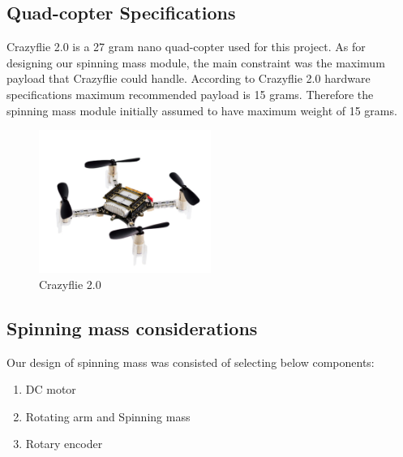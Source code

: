 \subsection{Quad-copter Specifications}
Crazyflie 2.0 is a 27 gram nano quad-copter used for this project. As for designing our spinning mass module, the main constraint was the maximum payload that Crazyflie could handle. According to Crazyflie 2.0 hardware specifications maximum recommended payload is 15 grams. Therefore the spinning mass module initially assumed to have maximum weight of 15 grams.
\begin{figure}[h]
\centering
\includegraphics[width=0.5\textwidth]{./Amir_img/CF.png}
\caption{Crazyflie 2.0}
\end{figure}

\subsection{Spinning mass considerations}
Our design of spinning mass was consisted of selecting below components:
\begin{enumerate}
  \item DC motor
  \item Rotating arm and Spinning mass
  \item Rotary encoder 
\end{enumerate}
